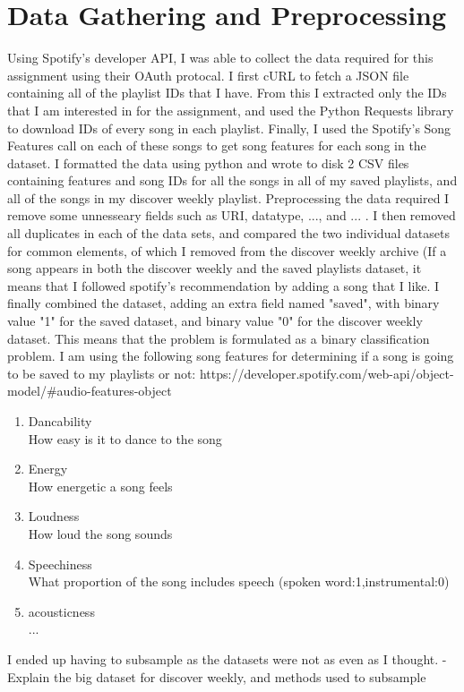 \documentclass{article}
\begin{document}
    \section{Data Gathering and Preprocessing}
        Using Spotify's developer API, I was able to collect the data required for this assignment using their OAuth protocal. I first cURL to fetch a JSON file containing all of the playlist IDs that I have. From this I extracted only the IDs that I am interested in for the assignment, and used the Python Requests library to download IDs of every song in each playlist. Finally, I used the Spotify's Song Features call on each of these songs to get song features for each song in the dataset. I formatted the data using python and wrote to disk 2 CSV files containing features and song IDs for all the songs in all of my saved playlists, and all of the songs in my discover weekly playlist.
        Preprocessing the data required I remove some unnesseary fields such as URI, datatype, ..., and ... . I then removed all duplicates in each of the data sets, and compared the two individual datasets for common elements, of which I removed from the discover weekly archive (If a song appears in both the discover weekly and the saved playlists dataset, it means that I followed spotify's recommendation by adding a song that I like. I finally combined the dataset, adding an extra field named "saved", with binary value "1" for the saved dataset, and binary value "0" for the discover weekly dataset. 
        This means that the problem is formulated as a binary classification problem. I am using the following song features for determining if a song is going to be saved to my playlists or not:
        https://developer.spotify.com/web-api/object-model/#audio-features-object
            \begin{enumerate}
                    \item Dancability \\
                          How easy is it to dance to the song
                    \item Energy \\
                            How energetic a song feels
                    \item Loudness \\
                            How loud the song sounds
                    \item Speechiness \\
                            What proportion of the song includes speech (spoken word:1,instrumental:0)
                    \item acousticness \\ ...
            \end{enumerate}

            I ended up having to subsample as the datasets were not as even as I thought. 
            - Explain the big dataset for discover weekly, and methods used to subsample
\end{document}
